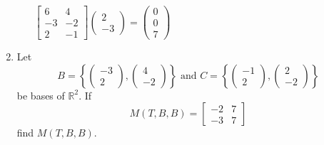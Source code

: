 \documentclass[letterpaper]{article}
\begin{document}
\begin{enumerate}
\begin{enumerate}
  $
  \left[\begin{array}{rr}6&4\\-3&-2\\2&-1\end{array}\right]
  \left(\begin{array}{r}2\\-3\end{array}\right)
  =
  \left(\begin{array}{r}0\\0\\7\end{array}\right)
  $
  \end{enumerate}
\item
Let
\[
B=
\left\{\left(\begin{array}{r}-3\\2\end{array}\right),\left(\begin{array}{r}4\\-2\end{array}\right)\right\}
\text{ and }
C=
\left\{\left(\begin{array}{r}-1\\2\end{array}\right),\left(\begin{array}{r}2\\-2\end{array}\right)\right\}
\]
be bases of $\mathbb{R}^2$. If
\[M(T,B,B)=\left[\begin{array}{rr}-2&7\\-3&7\end{array}\right]\]
find $M(T,B,B)$.


\end{enumerate}
\end{document}
